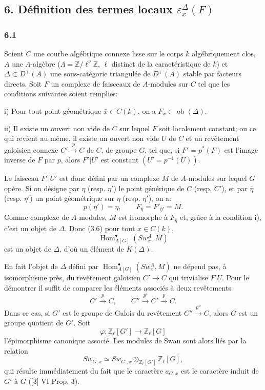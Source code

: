 \documentclass[11pt]{article}
\DeclareMathOperator{\Hom}{Hom}
\providecommand{\Ob}{\operatorname{ob}}
\providecommand{\Hom}{\operatorname{Hom}}
\providecommand{\Ob}{\operatorname{ob}}
\providecommand{\Ob}{\operatorname{Ob}}
\providecommand{\Hom}{\operatorname{Hom}}
\providecommand{\Ob}{\operatorname{ob}}
\begin{document}
\subsection*{6. Définition des termes locaux $\varepsilon_x^\Delta(F)$}

\subsubsection*{6.1}

Soient $C$ une courbe algébrique connexe lisse sur le corps $k$ algébriquement clos, $A$ une $\Lambda$-algèbre ($\Lambda=\mathbb Z/\ell^\nu\mathbb Z$, $\ell$ distinct de la caractéristique de $k$) et $\Delta\subset D^+(A)$ une sous-catégorie triangulée de $D^+(A)$ stable par facteurs directs. Soit $F$ un complexe de faisceaux de $A$-modules sur $C$ tel que les conditions suivantes soient remplies:

i) Pour tout point géométrique $\bar x\in C(k)$, on a $F_{\bar x}\in\Ob(\Delta)$.

ii) Il existe un ouvert non vide de $C$ sur lequel $F$ soit localement constant; ou ce qui revient au même, il existe un ouvert non vide $U$ de $C$ et un revêtement galoisien connexe $C'\xrightarrow{p}C$ de $C$, de groupe $G$, tel que, si $F'=p^*(F)$ est l'image inverse de $F$ par $p$, alors $F'|U'$ est constant $(U'=p^{-1}(U))$.

Le faisceau $F'|U'$ est donc défini par un complexe $M$ de $A$-modules sur lequel $G$ opère. Si on désigne par $\eta$ (resp. $\eta'$) le point générique de $C$ (resp. $C'$), et par $\bar\eta$ (resp. $\bar\eta'$) un point géométrique sur $\eta$ (resp. $\eta'$), on a:
\[
p(\eta')=\eta,\qquad
F_{\bar\eta}=F'_{\bar\eta'}=M.
\tag{6.1.1}
\]
Comme complexe de $A$-modules, $M$ est isomorphe à $F_{\bar\eta}$ et, grâce à la condition i), c'est un objet de $\Delta$. Donc (3.6) pour tout $x\in C(k)$,
\[
\Hom^\bullet_{A[G]}(Sw_x^A,M)
\]
est un objet de $\Delta$, d'où un élément de $K(\Delta)$.

En fait l'objet de $\Delta$ défini par $\Hom^\bullet_{A[G]}(Sw_x^A,M)$ ne dépend pas, à isomorphisme près, du revêtement galoisien $C'\to C$ qui trivialise $F|U$. Pour le démontrer il suffit de comparer les éléments associés à deux revêtements
\[
C'\xrightarrow{p}C,\qquad C''\xrightarrow{p'}C'\xrightarrow{p}C.
\]
Dans ce cas, si $G'$ est le groupe de Galois du revêtement $C''\xrightarrow{p''}C$, alors $G$ est un groupe quotient de $G'$. Soit
\[
\varphi:\mathbb Z_\ell[G']\longrightarrow \mathbb Z_\ell[G]
\]
l'épimorphisme canonique associé. Les modules de Swan sont alors liés par la relation
\[
Sw_{G,x}\simeq Sw_{G',x}\otimes_{\mathbb Z_\ell[G']}\mathbb Z_\ell[G],
\]
qui résulte immédiatement du fait que le caractère $a_{G,x}$ est le caractère induit de $G'$ à $G$ ([3] VI Prop. 3).
\end{document}

